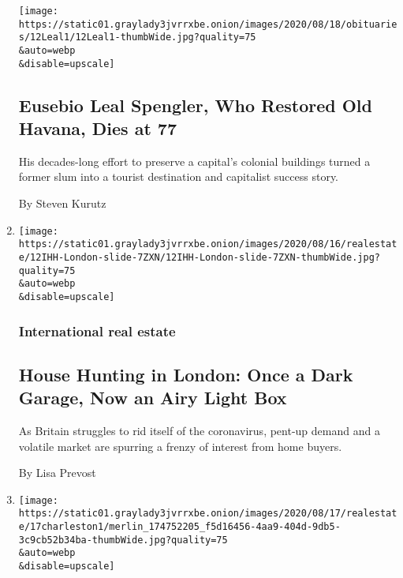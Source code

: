 \begin{enumerate}
  \texttt{[image: https://static01.graylady3jvrrxbe.onion/images/2020/08/18/obituaries/12Leal1/12Leal1-thumbWide.jpg?quality=75\\\&auto=webp\\\&disable=upscale]}

  \hypertarget{eusebio-leal-spengler-who-restored-old-havana-dies-at-77}{%
  \subsection{Eusebio Leal Spengler, Who Restored Old Havana, Dies at
  77}\label{eusebio-leal-spengler-who-restored-old-havana-dies-at-77}}

  His decades-long effort to preserve a capital's colonial buildings
  turned a former slum into a tourist destination and capitalist success
  story.

  By Steven Kurutz
\item
  \href{/2020/08/12/realestate/house-hunting-in-london-once-a-dark-garage-now-an-airy-light-box.html}{}

  \texttt{[image: https://static01.graylady3jvrrxbe.onion/images/2020/08/16/realestate/12IHH-London-slide-7ZXN/12IHH-London-slide-7ZXN-thumbWide.jpg?quality=75\\\&auto=webp\\\&disable=upscale]}

  \hypertarget{international-real-estate-1}{%
  \subsubsection{International real
  estate}\label{international-real-estate-1}}

  \hypertarget{house-hunting-in-london-once-a-dark-garage-now-an-airy-light-box}{%
  \subsection{House Hunting in London: Once a Dark Garage, Now an Airy
  Light
  Box}\label{house-hunting-in-london-once-a-dark-garage-now-an-airy-light-box}}

  As Britain struggles to rid itself of the coronavirus, pent-up demand
  and a volatile market are spurring a frenzy of interest from home
  buyers.

  By Lisa Prevost
\item
  \href{/2020/08/12/travel/charleston-tourism-black-lives-matter.html}{}

  \texttt{[image: https://static01.graylady3jvrrxbe.onion/images/2020/08/17/realestate/17charleston1/merlin\_174752205\_f5d16456-4aa9-404d-9db5-3c9cb52b34ba-thumbWide.jpg?quality=75\\\&auto=webp\\\&disable=upscale]}


\end{enumerate}
